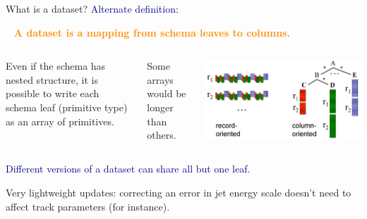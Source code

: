 \documentclass{beamer}
\begin{document}
\begin{frame}{What is a dataset?}
\vspace{0.5 cm}
\textcolor{darkblue}{\large Alternate definition:}

\vspace{0.2 cm}
\mbox{ } \hfill \textcolor{darkorange}{\bf A dataset is a mapping from schema leaves to columns.} \hfill \mbox{ }

\vspace{0.5 cm}
\begin{columns}
Even if the schema has nested structure, it is possible to write each schema leaf (primitive type) as an array of primitives.

\vspace{0.2 cm}
Some arrays would be longer than others.

\vspace{-0.4 cm}
\includegraphics[width=\linewidth]{columnar.png}
\end{columns}

\vspace{0.5 cm}
\begin{center}
\large \textcolor{darkblue}{Different versions of a dataset can share all but one leaf.}

\vspace{0.4 cm}
\normalsize Very lightweight updates: correcting an error in jet energy scale doesn't need to affect track parameters (for instance).
\end{center}
\end{frame}
\end{document}
